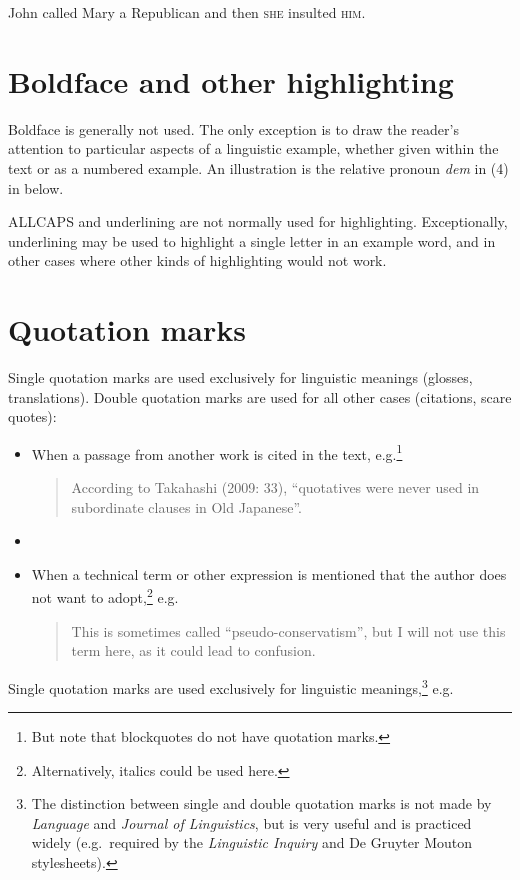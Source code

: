 \documentclass[a4paper]{article}
\newenvironment{gsrexq}{\begin{quote}\color{blue}}{\end{quote}}
\newcommand{\eagsr}{\bgroup\color{blue}\ea}
\newcommand{\zgsr}{\z\egroup}
\begin{document}
\eagsr
  John called Mary a Republican and then \textsc{she} insulted \textsc{him}.
\zgsr

\section{Boldface and other
highlighting}\label{sec:boldface-and-other-highlighting}

Boldface is generally not used. The only exception is to draw the
reader's attention to particular aspects of a linguistic example,
whether given within the text or as a numbered example. An illustration
is the relative pronoun \textit{dem} in (4) in  below. 

ALLCAPS and
underlining are not normally used for highlighting. Exceptionally,
underlining may be used to highlight a single letter in an example word,
and in other cases where other kinds of highlighting would not work.

\section{Quotation marks}\label{sec:quotation-marks}

Single quotation marks are used exclusively for linguistic meanings
(glosses, translations). Double quotation marks are used for all other
cases (citations, scare quotes):

\begin{itemize}
\item  When a passage from another work is cited in the text, e.g.\footnote{But note that blockquotes do not have quotation marks.}
    \begin{gsrexq} 
      According to Takahashi (2009: 33), ``quotatives were never used in subordinate clauses in Old Japanese''.
    \end{gsrexq}
\item   \item When a technical term or other expression is mentioned that the author does not want to adopt,\footnote{Alternatively, italics could be used here.} e.g.
    \begin{gsrexq}
      This is sometimes called ``pseudo-conservatism'', but I will not use this term here, as it could lead to confusion.
    \end{gsrexq}
\end{itemize}

Single quotation marks are used exclusively for
linguistic meanings,\footnote{The distinction between single and double
quotation marks is not made by \textit{Language} and \textit{Journal of Linguistics}, but
is very useful and is practiced widely (e.g.~required by the \textit{Linguistic
Inquiry} and De Gruyter Mouton stylesheets).} e.g.
\end{document}
